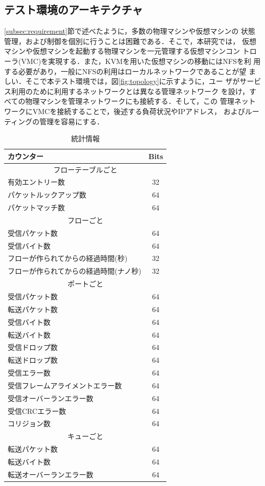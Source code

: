 \documentclass[submit,techrep]{ipsj}
\begin{document}
\subsection{テスト環境のアーキテクチャ}\label{subsec:arch}
\ref{subsec:requirement}節で述べたように，多数の物理マシンや仮想マシンの
状態管理，および制御を個別に行うことは困難である．そこで，本研究では，
仮想マシンや仮想マシンを起動する物理マシンを一元管理する仮想マシンコン
トローラ(VMC)を実現する．また，KVMを用いた仮想マシンの移動にはNFSを利
用する必要があり，一般にNFSの利用はローカルネットワークであることが望
ましい．そこで本テスト環境では，図\ref{fig:topology}に示すように，ユー
ザがサービス利用のために利用するネットワークとは異なる管理ネットワーク
を設け，すべての物理マシンを管理ネットワークにも接続する．そして，この
管理ネットワークにVMCを接続することで，後述する負荷状況やIPアドレス，
およびルーティングの管理を容易にする．

\begin{table}[htb]
	\centering
	\caption{統計情報\cite{opf}}
	\label{tab:counters}
	\vspace{3mm}
	{
		\begin{tabular}{|l|c|} \hline
		カウンター & Bits \\ \hline \hline
		\multicolumn{2}{|c|}{フローテーブルごと} \\ \hline
    有効エントリー数 & 32 \\
    パケットルックアップ数 & 64 \\
    パケットマッチ数 & 64 \\ \hline
		\multicolumn{2}{|c|}{フローごと}\\ \hline
    受信パケット数 & 64 \\
    受信バイト数 & 64 \\
    フローが作られてからの経過時間(秒) & 32 \\
    フローが作られてからの経過時間(ナノ秒) & 32 \\ \hline
		\multicolumn{2}{|c|}{ポートごと} \\ \hline
    受信パケット数 & 64 \\
    転送パケット数 & 64 \\
    受信バイト数 & 64 \\
    転送バイト数 & 64 \\
    受信ドロップ数& 64 \\
    転送ドロップ数& 64 \\
    受信エラー数 & 64 \\
    受信フレームアライメントエラー数 & 64 \\
    受信オーバーランエラー数 & 64 \\
    受信CRCエラー数 & 64 \\
    コリジョン数 & 64 \\ \hline
    \multicolumn{2}{|c|}{キューごと} \\ \hline
    転送パケット数 & 64 \\
    転送バイト数 & 64 \\
    転送オーバーランエラー数 & 64 \\ \hline
		\end{tabular}
	}
\end{table}
\end{document}
